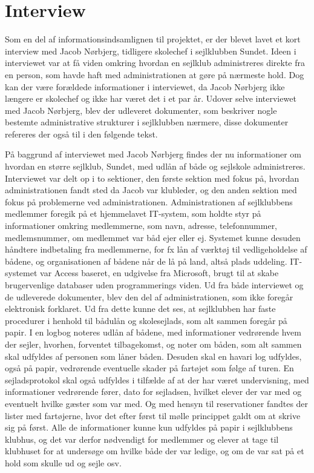 \chapter{Interview}\label{bilag:interview}
Som en del af informationsindsamlignen til projektet, er der blevet lavet et kort interview med Jacob Nørbjerg, tidligere skolechef i sejlklubben Sundet. Ideen i interviewet var at få viden omkring hvordan en sejlklub administreres direkte fra en person, som havde haft med administrationen at gøre på nærmeste hold. Dog kan der være forældede informationer i interviewet, da Jacob Nørbjerg ikke længere er skolechef og ikke har været det i et par år. Udover selve interviewet med Jacob Nørbjerg, blev der udleveret dokumenter, som beskriver nogle bestemte administrative strukturer i sejlklubben nærmere, disse dokumenter refereres der også til i den følgende tekst.

På baggrund af interviewet med Jacob Nørbjerg findes der nu informationer om hvordan en større sejlklub, Sundet, med udlån af både og sejlskole administreres. Interviewet var delt op i to sektioner, den første sektion med fokus på, hvordan administrationen fandt sted da Jacob var klubleder, og den anden sektion med fokus på problemerne ved administrationen. Administrationen af sejlklubbens medlemmer foregik på et hjemmelavet IT-system, som holdte styr på informationer omkring medlemmerne, som navn, adresse, telefonnummer, medlemsnummer, om medlemmet var båd ejer eller ej. Systemet kunne desuden håndtere indbetaling fra medlemmerne, for fx lån af værktøj til vedligeholdelse af bådene, og organisationen af bådene når de lå på land, altså plads uddeling. IT-systemet var Access baseret, en udgivelse fra Microsoft, brugt til at skabe brugervenlige databaser uden programmerings viden.
Ud fra både interviewet og de udleverede dokumenter, blev den del af administrationen, som ikke foregår elektronisk forklaret. Ud fra dette kunne det ses, at sejlklubben har faste procedurer i henhold til bådulån og skolesejlads, som alt sammen foregår på papir. I en logbog noteres udlån af bådene, med informationer vedrørende hvem der sejler, hvorhen, forventet tilbagekomst, og noter om båden, som alt sammen skal udfyldes af personen som låner båden. Desuden skal en havari log udfyldes, også på papir, vedrørende eventuelle skader på fartøjet som følge af turen. En sejladsprotokol skal også udfyldes i tilfælde af at der har været undervisning, med informationer vedrørende fører, dato for sejladsen, hvilket elever der var med og eventuelt hvilke gæster som var med. Og med hensyn til reservationer fandtes der lister med fartøjerne, hvor det efter først til mølle princippet galdt om at skrive sig på først. Alle de informationer kunne kun udfyldes på papir i sejlklubbens klubhus, og det var derfor nødvendigt for medlemmer og elever at tage til klubhuset for at undersøge om hvilke både der var ledige, og om de var sat på et hold som skulle ud og sejle osv. 

